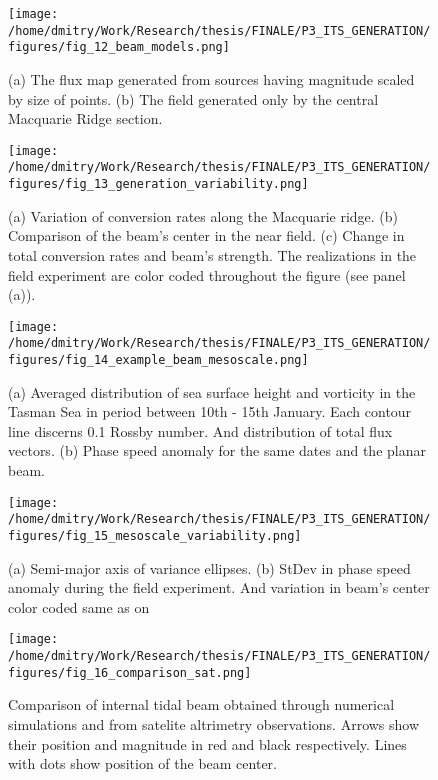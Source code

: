 \documentclass[12pt]{article}
\begin{document}
\begin{figure}
	\centering
	\texttt{[image: /home/dmitry/Work/Research/thesis/FINALE/P3\_ITS\_GENERATION/figures/fig\_12\_beam\_models.png]}
	\caption{(a) The flux map generated from sources having magnitude scaled by size of points. (b) 
	The field generated only by the central Macquarie Ridge section.}
	\label{C3.fig:beam_inv}
\end{figure}

\begin{figure}
	\centering
	\texttt{[image: /home/dmitry/Work/Research/thesis/FINALE/P3\_ITS\_GENERATION/figures/fig\_13\_generation\_variability.png]}
	\caption{(a) Variation of conversion rates along the Macquarie ridge. (b) Comparison of the 
	beam's center in the near field. (c) Change in total conversion rates and beam's strength. The 
	realizations in the field experiment are color coded throughout the figure (see panel (a)).}
	\label{C3.fig:gen_var_beam}
\end{figure}

\begin{figure}
	\centering
	\texttt{[image: /home/dmitry/Work/Research/thesis/FINALE/P3\_ITS\_GENERATION/figures/fig\_14\_example\_beam\_mesoscale.png]}
	\caption{(a) Averaged distribution of sea surface height and vorticity in the Tasman Sea in 
	period between 10th - 15th January. Each contour line discerns 0.1 Rossby number. And 	
	distribution of total flux vectors. (b) Phase speed anomaly for the same dates and the planar 
	beam.}
	\label{C3.fig:meso_examp}
\end{figure}

\begin{figure}
	\centering
	\texttt{[image: /home/dmitry/Work/Research/thesis/FINALE/P3\_ITS\_GENERATION/figures/fig\_15\_mesoscale\_variability.png]}
	\caption{(a) Semi-major axis of variance ellipses. (b) StDev in phase speed anomaly during the 	
	field experiment. And variation in beam's center color coded same as on 
	}
	\label{C3.fig:var_meso}
\end{figure}

\begin{figure}
	\centering
	\texttt{[image: /home/dmitry/Work/Research/thesis/FINALE/P3\_ITS\_GENERATION/figures/fig\_16\_comparison\_sat.png]}
	\caption{Comparison of internal tidal beam obtained through numerical simulations and from 
	satelite altrimetry observations. Arrows show their position and magnitude in red and black 
	respectively. Lines with dots show position of the beam center.}
	\label{C3.fig:cmp_sat_nexp}
\end{figure}
\end{document}
